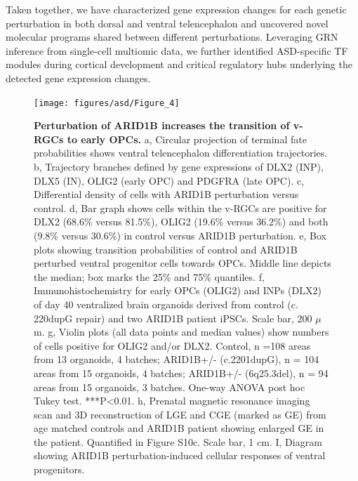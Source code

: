 Taken together, we have characterized gene expression changes for each genetic perturbation in both dorsal and ventral telencephalon and uncovered novel molecular programs shared between different perturbations. Leveraging GRN inference from single-cell multiomic data, we further identified ASD-specific TF modules during cortical development and critical regulatory hubs underlying the detected gene expression changes.

\begin{figure}[b!]
    \centering
	\texttt{[image: figures/asd/Figure\_4]}
    \caption{\textbf{Perturbation of ARID1B increases the transition of v-RGCs to early OPCs.}
    a, Circular projection of terminal fate probabilities shows ventral telencephalon differentiation trajectories. b, Trajectory branches defined by gene expressions of DLX2 (INP), DLX5 (IN), OLIG2 (early OPC) and PDGFRA (late OPC). c, Differential density of cells with ARID1B perturbation versus control. d, Bar graph shows cells within the v-RGCs are positive for DLX2 (68.6\% versus 81.5\%), OLIG2 (19.6\% versus 36.2\%) and both (9.8\% versus 30.6\%) in control versus ARID1B perturbation. e, Box plots showing transition probabilities of control and ARID1B perturbed ventral progenitor cells towards OPCs. Middle line depicts the median; box marks the 25\% and 75\% quantiles. f, Immunohistochemistry for early OPCs (OLIG2) and INPs (DLX2) of day 40 ventralized brain organoids derived from control (c. 220dupG repair) and two ARID1B patient iPSCs. Scale bar, 200 $\mu$m. g, Violin plots (all data points and median values) show numbers of cells positive for OLIG2 and/or DLX2. Control, n =108 areas from 13 organoids, 4 batches; ARID1B+/- (c.2201dupG), n = 104 areas from 15 organoids, 4 batches; ARID1B+/- (6q25.3del), n = 94 areas from 15 organoids, 3 batches. One-way ANOVA post hoc Tukey test. ***P<0.01. h, Prenatal magnetic resonance imaging scan and 3D reconstruction of LGE and CGE (marked as GE) from age matched controls and ARID1B patient showing enlarged GE in the patient. Quantified in Figure S10c. Scale bar, 1 cm. I, Diagram showing ARID1B perturbation-induced cellular responses of ventral progenitors.}
    \label{fig:asd4}
\end{figure}


